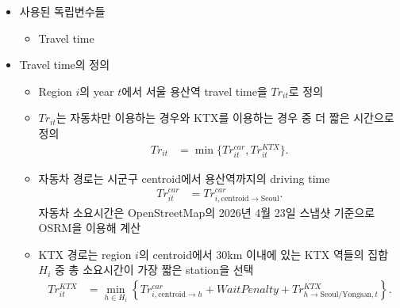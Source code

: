 \documentclass[a4paper, 10pt]{article}
\begin{document}
\begin{itemize}
\begin{itemize}
                    \item 인턴, 레지던트, 전문의, 일반의 명수
                \end{itemize}
            \item 사용된 독립변수들
                \begin{itemize}
                    \item Travel time
                \end{itemize}
            \item Travel time의 정의
                \begin{itemize}
                    \item Region $i$의 year $t$에서 서울 용산역 travel time을
                        $Tr_{it}$로 정의
                    \item $Tr_{it}$는 자동차만 이용하는 경우와 KTX를 이용하는 경우 중 더 짧은 시간으로 정의
                        \begin{align*}
                            Tr_{it}
                            &=
                            \min\{Tr^{car}_{it}, Tr^{KTX}_{it}\}.
                        \end{align*}
                    \item 자동차 경로는 시군구 centroid에서 용산역까지의 driving time
                        \begin{align*}
                            Tr^{car}_{it}
                            &=
                            Tr^{car}_{i,\text{centroid}\rightarrow\text{Seoul}}.
                        \end{align*}
                        자동차 소요시간은 OpenStreetMap의 2026년 4월 23일 스냅샷 기준으로
                        OSRM을 이용해 계산
                    \item KTX 경로는 region $i$의 centroid에서 30km 이내에 있는 KTX 역들의 집합 $H_i$ 중
                        총 소요시간이 가장 짧은 station을 선택
                        \begin{align*}
                            Tr^{KTX}_{it}
                            &=
                            \min_{h \in H_i}
                            \left\{
                                Tr^{car}_{i,\text{centroid}\rightarrow h}
                                +
                                WaitPenalty
                                +
                                Tr^{KTX}_{h\rightarrow\text{Seoul/Yongsan},t}
                            \right\}.
                        \end{align*}

\end{itemize}
\end{itemize}
\end{document}
